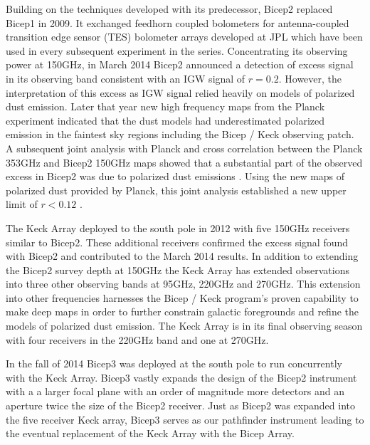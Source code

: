 \documentclass[12pt]{article}
\begin{document}
Building on the techniques developed with its predecessor, Bicep2 replaced
Bicep1 in 2009. It exchanged feedhorn coupled bolometers for antenna-coupled
transition edge sensor (TES) bolometer arrays developed at JPL which have been
used in every subsequent experiment in the series. Concentrating its observing
power at 150GHz, in March 2014 Bicep2 announced a detection of excess signal
in its observing band consistent with an IGW signal of $r=0.2$\cite{cite:BK1}.
However, the interpretation of this excess as IGW signal relied heavily on
models of polarized dust emission. Later that year new high frequency maps from the Planck experiment
indicated that the dust models had underestimated polarized emission in the
faintest sky regions \cite{cite:PlanckXIX} including the Bicep / Keck
observing patch. A subsequent joint analysis with Planck and cross correlation
between the Planck 353GHz and Bicep2 150GHz maps showed that a substantial
part of the observed excess in Bicep2 was due to polarized dust emissions
\cite{cite:BKP}. Using the new maps of polarized dust provided by Planck, this
joint analysis established a new upper limit of $r<0.12$ \cite{cite:BKP}.

The Keck Array deployed to the south pole in 2012 with five 150GHz receivers
similar to Bicep2. These additional receivers confirmed the excess signal
found with Bicep2 and contributed to the March 2014 results. In addition to
extending the Bicep2 survey depth at 150GHz the Keck Array has extended
observations into three other observing bands at 95GHz, 220GHz and 270GHz.
This extension into other frequencies harnesses the Bicep / Keck program's
proven capability to make deep maps in order to further constrain galactic foregrounds
and refine the models of polarized dust emission. The Keck Array is in its
final observing season with four receivers in the 220GHz band and one at
270GHz.

In the fall of 2014 Bicep3 was deployed at the south pole to run concurrently
with the Keck Array. Bicep3 vastly expands the design of the Bicep2 instrument with a
a larger focal plane with an order of magnitude more detectors and an aperture
twice the size of the Bicep2 receiver. Just as Bicep2 was expanded into the
five receiver Keck array, Bicep3 serves as our pathfinder instrument leading
to the eventual replacement of the Keck Array with the Bicep Array.
\end{document}
